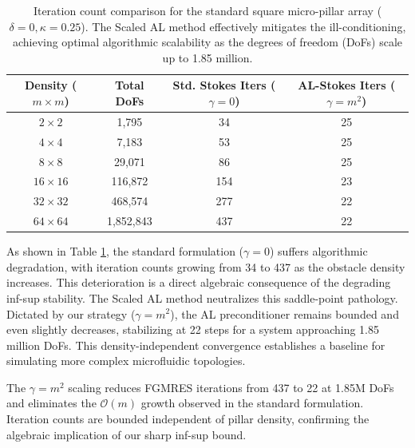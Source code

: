 \documentclass{elsarticle}
\begin{document}
\begin{table}[htbp]
    \centering
    \caption{Iteration count comparison for the standard square micro-pillar array ($\delta = 0, \kappa = 0.25$). The Scaled AL method effectively mitigates the ill-conditioning, achieving optimal algorithmic scalability as the degrees of freedom (DoFs) scale up to 1.85 million.}
    \label{tab:solver_iterations_square}
    \begin{tabular}{cccc}
        \toprule
        Density ($m \times m$) & Total DoFs & Std. Stokes Iters ($\gamma=0$) & AL-Stokes Iters ($\gamma = m^2$) \\
        \midrule
        $2 \times 2$           & 1,795      & 34                             & 25                               \\
        $4 \times 4$           & 7,183      & 53                             & 25                               \\
        $8 \times 8$           & 29,071     & 86                             & 25                               \\
        $16 \times 16$         & 116,872    & 154                            & 23                               \\
        $32 \times 32$         & 468,574    & 277                            & 22                               \\
        $64 \times 64$         & 1,852,843  & 437                            & 22                               \\
        \bottomrule
    \end{tabular}
\end{table}

As shown in Table \ref{tab:solver_iterations_square}, the standard formulation ($\gamma=0$) suffers algorithmic degradation, with iteration counts growing from 34 to 437 as the obstacle density increases. This deterioration is a direct algebraic consequence of the degrading inf-sup stability. The Scaled AL method neutralizes this saddle-point pathology. Dictated by our strategy ($\gamma = m^2$), the AL preconditioner remains bounded and even slightly decreases, stabilizing at 22 steps for a system approaching 1.85 million DoFs. This density-independent convergence establishes a baseline for simulating more complex microfluidic topologies.

The $\gamma = m^2$ scaling reduces FGMRES iterations from 437 to 22 at 1.85M DoFs and eliminates the $\mathcal{O}(m)$ growth observed in the standard formulation. Iteration counts are bounded independent of pillar density, confirming the algebraic implication of our sharp inf-sup bound.
\end{document}
